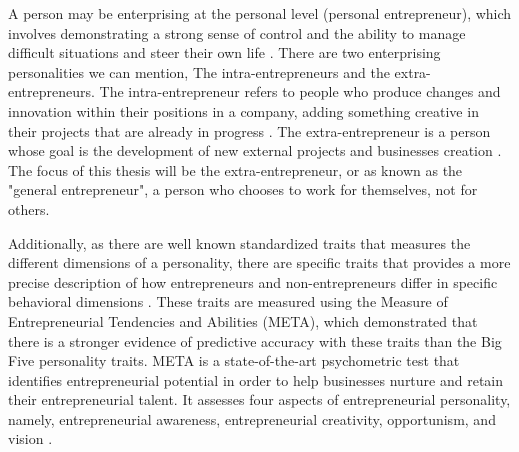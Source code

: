 A person may be enterprising at the personal level (personal entrepreneur), which involves demonstrating a strong sense of control and the ability to manage difficult situations and steer their own life \cite{frese20014}. There are two enterprising personalities we can mention, The intra-entrepreneurs and the extra-entrepreneurs. The intra-entrepreneur refers to people who produce changes and innovation within their positions in a company, adding something creative in their projects that are already in progress \cite{mumford2020intrapreneurship}. The extra-entrepreneur is a person whose goal is the development of new external projects and businesses creation \cite{postigo2021general}. The focus of this thesis will be the extra-entrepreneur, or as known as the "general entrepreneur", a person who chooses to work for themselves, not for others.

Additionally, as there are well known standardized traits that measures the different dimensions of a personality, there are specific traits that provides a more precise description of how entrepreneurs and non-entrepreneurs differ in specific behavioral dimensions \cite{postigo2021general}. These traits are measured using the Measure of Entrepreneurial Tendencies and Abilities (META), which demonstrated that there is a stronger evidence of predictive accuracy with these traits than the Big Five personality traits. META is a state-of-the-art psychometric test that identifies entrepreneurial potential in order to help businesses nurture and retain their entrepreneurial talent. It assesses four aspects of entrepreneurial personality, namely, entrepreneurial awareness, entrepreneurial creativity, opportunism, and vision  \cite{ahmetoglu2011eq}.

